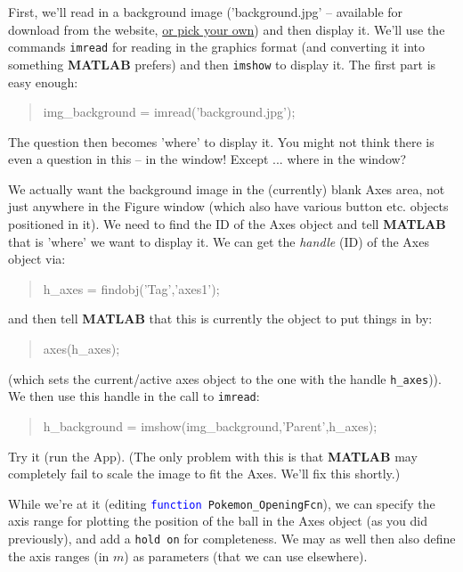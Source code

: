 \documentclass{tufte-book} %
\newenvironment{docspec}{\begin{quotation}\ttfamily\parskip0pt\parindent0pt\ignorespaces}{\end{quotation}}
\begin{document}
\noindent First, we'll read in a background image ('background.jpg' -- available for download from the  website, \uline{or pick your own}) and then display it. We'll use the commands \texttt{imread} for reading in the graphics format (and converting it into something \textbf{MATLAB} prefers) and then \texttt{imshow} to display it. The first part is easy enough:
\begin{docspec}
img\_background = imread(\textcolor[rgb]{0.501961,0,1}{'background.jpg'});
\end{docspec}
The question then becomes 'where' to display it. You might not think there is even a question in this -- in the window! Except ... where in the window?

We actually want the background image in the (currently) blank \textsf{Axes} area, not just anywhere in the \textsf{Figure window} (which also have various button etc. objects positioned in it). We need to find the ID of the \textsf{Axes} object and tell \textbf{MATLAB} that is 'where' we want to display it. We can get the \textit{handle} (ID) of the \textsf{Axes} object via:
\begin{docspec}
h\_axes = findobj(\textcolor[rgb]{0.501961,0,1}{'Tag'},\textcolor[rgb]{0.501961,0,1}{'axes1'});
\end{docspec}
and then tell \textbf{MATLAB} that this is currently the object to put things in by:
\begin{docspec}
axes(h\_axes);
\end{docspec}
(which sets the current/active axes object to the one with the handle \texttt{h\_axes})).
We then use this handle in the call to \texttt{imread}:
\begin{docspec}
h\_background = imshow(img\_background,\textcolor[rgb]{0.501961,0,1}{'Parent'},h\_axes);
\end{docspec}
Try it (run the App). (The only problem with this is that \textbf{MATLAB} may completely fail to scale the image to fit the \textsf{Axes}. We'll fix this shortly.)

While we're at it (editing \texttt{\textcolor{blue}{function} Pokemon\_OpeningFcn}), we can specify the axis range for plotting the position of the ball in the Axes object (as you did previously), and add a \texttt{hold on} for completeness. We may as well then also define the axis ranges (in \(m\)) as parameters (that we can use elsewhere).
\end{document}

